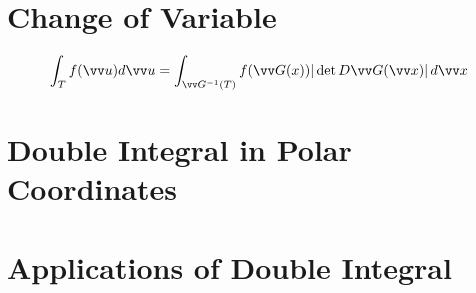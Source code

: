 \section{Change of Variable}

\begin{theorem}
$$
\int_T f(\vv u) d\vv u = \int_{\vv G^{-1}(T)} f(\vv G(x)) |\det D\vv G(\vv x)|\, d\vv x
$$
\end{theorem}

\section{Double Integral in Polar Coordinates}

\section{Applications of Double Integral}